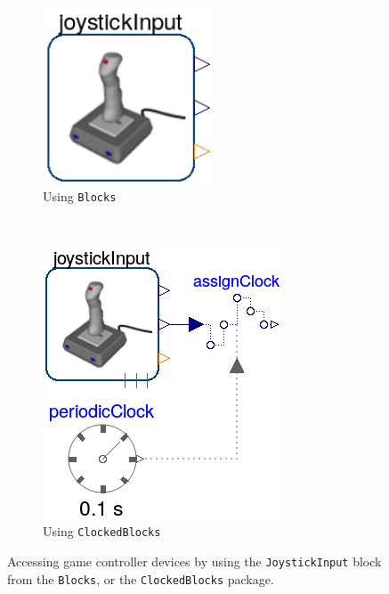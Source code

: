 \documentclass{resources/modelica}
\newcommand{\modelica}[1]{\lstinline[language=modelica]|#1|}
\begin{document}
\begin{figure}[htb]
  \centering
  \begin{subfigure}[b]{0.45\columnwidth}
     \centering
     \includegraphics[width=0.55\textwidth]{figures/MDDJoystick}
     \caption{Using \modelica{Blocks}}
     \label{fig:MDDJoystick}
  \end{subfigure}%
  ~ %
  \begin{subfigure}[b]{0.45\columnwidth}
          \includegraphics[width=\textwidth]{figures/MDDJoystickClocked}
          \caption{Using \modelica{ClockedBlocks}}
          \label{fig:MDDJoystickClocked}
  \end{subfigure}
  \caption{Accessing game controller devices by using the
  \modelica{JoystickInput} block from the \modelica{Blocks}, or the
  \modelica{ClockedBlocks} package.}
  \label{fig:JoystickBlocks}
\end{figure}
\end{document}
